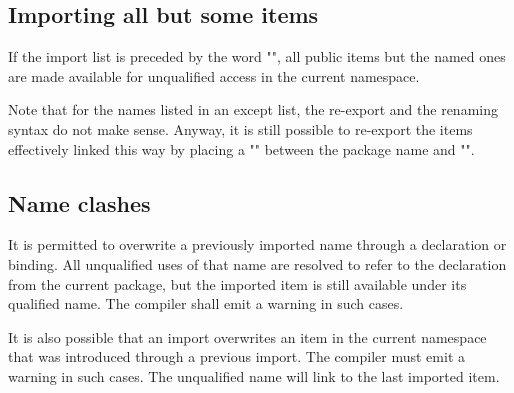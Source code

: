 
\subsection{Importing all but some items}

If the import list is preceded by the word "", all public items but the named ones are made available for unqualified access in the current namespace.


Note that for the names listed in an except list, the re-export and the renaming syntax do not make sense. 
Anyway, it is still possible to re-export the items effectively linked this way by placing a "" between the package name and "".


\subsection{Name clashes}


It is permitted to overwrite a previously imported name through a declaration or binding.
All unqualified uses of that name are resolved to refer to the declaration from the current package, 
but the imported item is still available under its qualified name.
The compiler shall emit a warning in such cases.

It is also possible that an import overwrites an item in the current namespace that was introduced through a previous import.
The compiler must emit a warning in such cases.
The unqualified name will link to the last imported item.

